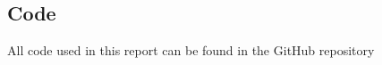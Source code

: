 \documentclass{article}
\theoremstyle{definition}
\numberwithin{equation}{section}
\begin{document}
\subsection{Code}

All code used in this report can be found in the GitHub repository \cite{github}

\label{sec:frules}
\end{document}
